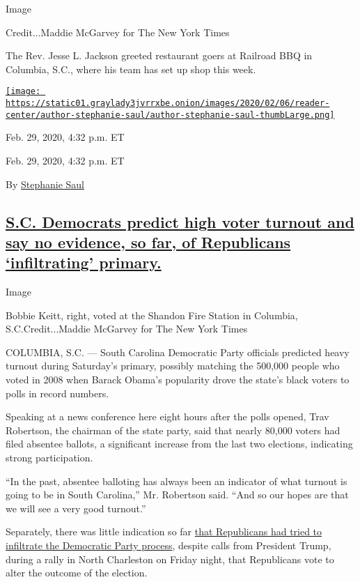 Image

Credit...Maddie McGarvey for The New York Times

The Rev. Jesse L. Jackson greeted restaurant goers at Railroad BBQ in
Columbia, S.C., where his team has set up shop this week.

\href{https://www.nytimes3xbfgragh.onion/by/stephanie-saul}{\texttt{[image: https://static01.graylady3jvrrxbe.onion/images/2020/02/06/reader-center/author-stephanie-saul/author-stephanie-saul-thumbLarge.png]}}

Feb. 29, 2020, 4:32 p.m. ET

Feb. 29, 2020, 4:32 p.m. ET

By \href{https://www.nytimes3xbfgragh.onion/by/stephanie-saul}{Stephanie
Saul}

\hypertarget{sc-democrats-predict-high-voter-turnout-and-say-no-evidence-so-far-of-republicans-infiltrating-primary}{%
\subsection{\texorpdfstring{\protect\hyperlink{voter-turnout}{S.C.
Democrats predict high voter turnout and say no evidence, so far, of
Republicans `infiltrating'
primary.}}{S.C. Democrats predict high voter turnout and say no evidence, so far, of Republicans `infiltrating' primary.}}\label{sc-democrats-predict-high-voter-turnout-and-say-no-evidence-so-far-of-republicans-infiltrating-primary}}

Image

Bobbie Keitt, right, voted at the Shandon Fire Station in Columbia,
S.C.Credit...Maddie McGarvey for The New York Times

COLUMBIA, S.C. --- South Carolina Democratic Party officials predicted
heavy turnout during Saturday's primary, possibly matching the 500,000
people who voted in 2008 when Barack Obama's popularity drove the
state's black voters to polls in record numbers.

Speaking at a news conference here eight hours after the polls opened,
Trav Robertson, the chairman of the state party, said that nearly 80,000
voters had filed absentee ballots, a significant increase from the last
two elections, indicating strong participation.

``In the past, absentee balloting has always been an indicator of what
turnout is going to be in South Carolina,'' Mr. Robertson said. ``And so
our hopes are that we will see a very good turnout.''

Separately, there was little indication so far
\href{https://www.nytimes3xbfgragh.onion/2020/02/25/us/south-carolina-primary-operation-chaos.html}{that
Republicans had tried to infiltrate the Democratic Party process},
despite calls from President Trump, during a rally in North Charleston
on Friday night, that Republicans vote to alter the outcome of the
election.


